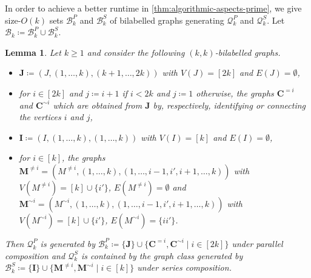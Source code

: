 \documentclass[a4paper,onecolumn,11pt,accepted=2026-01-06]{quantumarticle}
\theoremstyle{plain}
\newtheorem{lem}[thm]{Lemma}
\theoremstyle{remark}
\theoremstyle{definition}
\begin{document}
In order to achieve a better runtime in \cref{thm:algorithmic-aspects-prime}, we give size-$O(k)$ sets $\mathcal{B}_k^P$ and $\mathcal{B}_k^S$ of bilabelled graphs generating $\mathcal{Q}_k^P$ and $\mathcal{Q}_k^S$.
Let $\mathcal{B}_k \coloneqq \mathcal{B}_k^P \cup \mathcal{B}_k^S$.
\begin{lem} \label{lem:basal-graphs}
	Let $k \geq 1$ and consider the following $(k,k)$-bilabelled graphs.
	\begin{itemize}
		\item $\boldsymbol{J} \coloneqq (J, (1, \dots, k), (k+1, \dots, 2k))$ with $V(J) = [2k]$ and $E(J) = \emptyset$,
		\item for $i \in [2k]$ and $j \coloneqq i+1$ if $i < 2k$ and $j \coloneqq 1$ otherwise, the graphs $\boldsymbol{C}^{=i}$ and $\boldsymbol{C}^{\sim i}$ which are obtained from $\boldsymbol{J}$ by, respectively, identifying or connecting the vertices $i$ and $j$,
		\item $\boldsymbol{I} \coloneqq (I, (1, \dots, k), (1, \dots, k))$ with $V(I) = [k]$ and $E(I) = \emptyset$,
		\item for $i \in [k]$, the graphs $\boldsymbol{M}^{\neq i} = (M^{ \neq i}, (1, \dots, k), (1, \dots, i-1, i', i+1, \dots,k))$ with $V(M^{\neq i}) = [k] \cup \{i'\}$, $E(M^{\neq i}) = \emptyset$ and $\boldsymbol{M}^{\sim i} = (M^{\sim i}, (1, \dots, k), (1, \dots, i-1, i', i+1, \dots, k))$ with $V(M^{\sim i}) = [k] \cup \{i'\}$, $E(M^{\sim i}) = \{ii'\}$.
	\end{itemize}
	Then $\mathcal{Q}_k^P$ is generated by $\mathcal{B}_k^P \coloneqq \{\boldsymbol{J}\} \cup \{\boldsymbol{C}^{=i}, \boldsymbol{C}^{\sim i} \mid i \in [2k]\}$ under parallel composition
	and $\mathcal{Q}_k^S$ is contained by the graph class generated by $\mathcal{B}_k^S \coloneqq \{\boldsymbol{I}\} \cup \{\boldsymbol{M}^{\neq i}, \boldsymbol{M}^{\sim i} \mid i \in [k]\}$ under series composition.
\end{lem}
\end{document}
